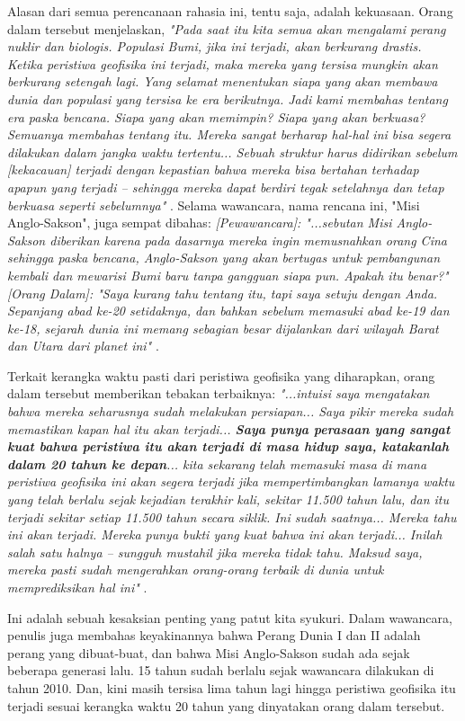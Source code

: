 \documentclass[10pt,twocolumn,letterpaper]{article}
\begin{document}
Alasan dari semua perencanaan rahasia ini, tentu saja, adalah kekuasaan. Orang dalam tersebut menjelaskan, \textit{"Pada saat itu kita semua akan mengalami perang nuklir dan biologis. Populasi Bumi, jika ini terjadi, akan berkurang drastis. Ketika peristiwa geofisika ini terjadi, maka mereka yang tersisa mungkin akan berkurang setengah lagi. Yang selamat menentukan siapa yang akan membawa dunia dan populasi yang tersisa ke era berikutnya. Jadi kami membahas tentang era paska bencana. Siapa yang akan memimpin? Siapa yang akan berkuasa? Semuanya membahas tentang itu. Mereka sangat berharap hal-hal ini bisa segera dilakukan dalam jangka waktu tertentu... Sebuah struktur harus didirikan sebelum [kekacauan] terjadi dengan kepastian bahwa mereka bisa bertahan terhadap apapun yang terjadi -- sehingga mereka dapat berdiri tegak setelahnya dan tetap berkuasa seperti sebelumnya"} \cite{4}. Selama wawancara, nama rencana ini, "Misi Anglo-Sakson", juga sempat dibahas: \textit{[Pewawancara]: "...sebutan Misi Anglo-Sakson diberikan karena pada dasarnya mereka ingin memusnahkan orang Cina sehingga paska bencana, Anglo-Sakson yang akan bertugas untuk pembangunan kembali dan mewarisi Bumi baru tanpa gangguan siapa pun. Apakah itu benar?" [Orang Dalam]: "Saya kurang tahu tentang itu, tapi saya setuju dengan Anda. Sepanjang abad ke-20 setidaknya, dan bahkan sebelum memasuki abad ke-19 dan ke-18, sejarah dunia ini memang sebagian besar dijalankan dari wilayah Barat dan Utara dari planet ini"} \cite{4}.

Terkait kerangka waktu pasti dari peristiwa geofisika yang diharapkan, orang dalam tersebut memberikan tebakan terbaiknya: \textit{"...intuisi saya mengatakan bahwa mereka seharusnya sudah melakukan persiapan... Saya pikir mereka sudah memastikan kapan hal itu akan terjadi... \textbf{Saya punya perasaan yang sangat kuat bahwa peristiwa itu akan terjadi di masa hidup saya, katakanlah dalam 20 tahun ke depan}... kita sekarang telah memasuki masa di mana peristiwa geofisika ini akan segera terjadi jika mempertimbangkan lamanya waktu yang telah berlalu sejak kejadian terakhir kali, sekitar 11.500 tahun lalu, dan itu terjadi sekitar setiap 11.500 tahun secara siklik. Ini sudah saatnya... Mereka tahu ini akan terjadi. Mereka punya bukti yang kuat bahwa ini akan terjadi... Inilah salah satu halnya -- sungguh mustahil jika mereka tidak tahu. Maksud saya, mereka pasti sudah mengerahkan orang-orang terbaik di dunia untuk memprediksikan hal ini"} \cite{4}.

Ini adalah sebuah kesaksian penting yang patut kita syukuri. Dalam wawancara, penulis juga membahas keyakinannya bahwa Perang Dunia I dan II adalah perang yang dibuat-buat, dan bahwa Misi Anglo-Sakson sudah ada sejak beberapa generasi lalu. 15 tahun sudah berlalu sejak wawancara dilakukan di tahun 2010. Dan, kini masih tersisa lima tahun lagi hingga peristiwa geofisika itu terjadi sesuai kerangka waktu 20 tahun yang dinyatakan orang dalam tersebut.
\end{document}
